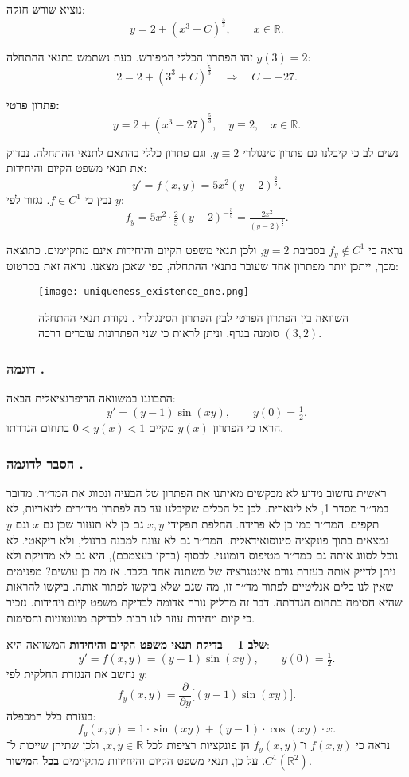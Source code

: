 \documentclass{article}
\numberwithin{equation}{section}
\newcounter{example}[section]
\renewcommand{\theexample}{\thesection.\arabic{example}}
\newcommand{\example}[1][]{%
  \refstepcounter{example}%
  \subsubsection*{דוגמה \theexample\; #1}%
  \label{exm:\theexample}%
}
\newcommand{\explanation}{%
  \subsubsection*{הסבר לדוגמה \theexample}%
}
\begin{document}
נוציא שורש חזקה:
\[
y = 2 + (x^3 + C)^{\tfrac{5}{3}}, 
\qquad x \in \mathbb{R}.
\]

זהו הפתרון הכללי המפורש.  
כעת נשתמש בתנאי ההתחלה $y(3)=2$:  
\[
2 = 2 + (3^3 + C)^{\tfrac{5}{3}} 
\quad \Longrightarrow \quad
C = -27.
\]

\textbf{פתרון פרטי:}
\[
\boxed{y = 2 + (x^3 - 27)^{\tfrac{5}{3}}, \quad y \equiv 2, \quad x \in \mathbb{R}.}
\]

נשים לב כי קיבלנו גם פתרון סינגולרי $y \equiv 2$, וגם פתרון כללי בהתאם לתנאי ההתחלה.  
נבדוק את תנאי משפט הקיום והיחידות:  
\[
y' = f(x,y) = 5x^2(y-2)^{\tfrac{2}{5}}.
\]
נבין כי
$f \in C^1$.
נגזור לפי $y$:  
\[
f_y = 5x^2 \cdot \tfrac{2}{5}(y-2)^{-\tfrac{3}{5}} 
= \tfrac{2x^2}{(y-2)^{\tfrac{3}{5}}}.
\]

נראה כי $f_y \notin C^1$ בסביבת $y=2$, ולכן תנאי משפט הקיום והיחידות אינם מתקיימים.  
כתוצאה מכך, ייתכן יותר מפתרון אחד שעובר בתנאי ההתחלה, כפי שאכן מצאנו. נראה זאת בסרטוט:
\begin{figure}[H]
    \centering
    \texttt{[image: uniqueness\_existence\_one.png]}
    \caption{השוואה בין הפתרון הפרטי 
    לבין הפתרון הסינגולרי 
    . 
    נקודת תנאי ההתחלה $(3,2)$ סומנה בגרף, וניתן לראות כי שני הפתרונות עוברים דרכה.}
    \label{fig:existence_uniqueness}
\end{figure}

\example{} התבוננו במשוואה הדיפרנציאלית הבאה: \[ y' = (y-1)\sin(xy), \qquad y(0)=\tfrac{1}{2}. \] הראו כי הפתרון $y(x)$ מקיים $0<y(x)<1$ בתחום הגדרתו. 

\explanation{} ראשית נחשוב מדוע לא מבקשים מאיתנו את הפתרון של הבעיה ונסווג את המד׳׳ר. מדובר במד׳׳ר מסדר 1, לא לינארית. לכן כל הכלים שקיבלנו עד כה לפתרון מד׳׳רים לינאריות, לא תקפים. המד׳׳ר כמו כן לא פרידה. החלפת תפקידי $x,y$ גם כן לא תעזור שכן גם $x$ וגם $y$ נמצאים בתוך פונקציה סינוסואידאלית. המד׳׳ר גם לא עונה למבנה ברנולי, ולא ריקאטי. לא נוכל לסווג אותה גם כמד׳׳ר מטיפוס הומוגני. לבסוף (בדקו בעצמכם), היא גם לא מדויקת ולא ניתן לדייק אותה בעזרת גורם אינטגרציה של משתנה אחד בלבד. אז מה כן עושים? מפנימים שאין לנו כלים אנליטיים לפתור מד׳׳ר זו, מה שגם שלא ביקשו לפתור אותה. ביקשו להראות שהיא חסימה בתחום הגדרתה. דבר זה מדליק נורה אדומה לבדיקת משפט קיום ויחידות. נזכיר כי קיום ויחידות עוזר לנו רבות לבדיקת מונוטוניות וחסימות. 

\textbf{שלב 1 – בדיקת תנאי משפט הקיום והיחידות} המשוואה היא: \[ y' = f(x,y) = (y-1)\sin(xy), \qquad y(0)=\tfrac{1}{2}. \] נחשב את הנגזרת החלקית לפי $y$: \[ f_y(x,y) = \frac{\partial}{\partial y}\big[(y-1)\sin(xy)\big]. \] בעזרת כלל המכפלה: \[ f_y(x,y) = 1\cdot \sin(xy) + (y-1)\cdot \cos(xy)\cdot x. \] נראה כי $f(x,y)$ ו־$f_y(x,y)$ הן פונקציות רציפות לכל $x,y \in \mathbb{R}$, ולכן שתיהן שייכות ל־$C^1(\mathbb{R}^2)$. על כן, תנאי משפט הקיום והיחידות מתקיימים \textbf{בכל המישור}. 
\end{document}
